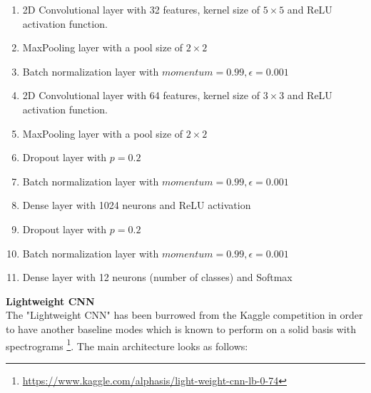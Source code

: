 \documentclass{article}
\theoremstyle{definition}
\theoremstyle{remark}
\begin{document}
\begin{enumerate}
	\item 2D Convolutional layer with 32 features, kernel size of $5 \times 5$ and ReLU activation function.
	\item MaxPooling layer with a pool size of $2 \times 2$
	\item Batch normalization layer with $momentum=0.99, \epsilon=0.001$
	\item 2D Convolutional layer with 64 features, kernel size of $3 \times 3$ and ReLU activation function.
	\item MaxPooling layer with a pool size of $2 \times 2$
	\item Dropout layer with $p = 0.2$
	\item Batch normalization layer with $momentum=0.99, \epsilon=0.001$
	\item Dense layer with 1024 neurons and ReLU activation
	\item Dropout layer with $p = 0.2$
	\item Batch normalization layer with $momentum=0.99, \epsilon=0.001$
	\item Dense layer with 12 neurons (number of classes) and Softmax
\end{enumerate}



\noindent\textbf{Lightweight CNN}\\

The "Lightweight CNN" has been burrowed from the Kaggle competition in order to have another baseline modes which is known to perform on a solid basis with spectrograms \footnote{\url{https://www.kaggle.com/alphasis/light-weight-cnn-lb-0-74}}. The main architecture looks as follows:
\end{document}
